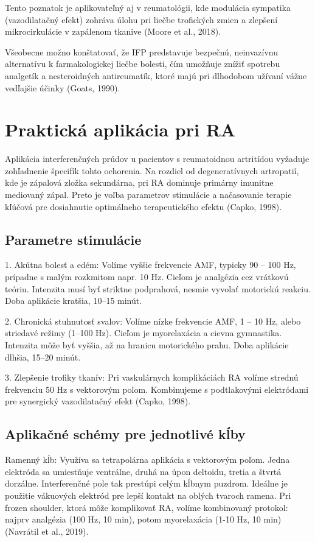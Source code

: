 Tento poznatok je aplikovateľný aj v reumatológii, kde modulácia sympatika (vazodilatačný efekt) zohráva úlohu pri liečbe trofických zmien a zlepšení mikrocirkulácie v zapálenom tkanive (Moore et al., 2018). 

Všeobecne možno konštatovať, že IFP predstavuje bezpečnú, neinvazívnu alternatívu k farmakologickej liečbe bolesti, čím umožňuje znížiť spotrebu analgetík a nesteroidných antireumatík, ktoré majú pri dlhodobom užívaní vážne vedľajšie účinky (Goats, 1990). 

\section{Praktická aplikácia pri RA}

Aplikácia interferenčných prúdov u pacientov s reumatoidnou artritídou vyžaduje zohľadnenie špecifík tohto ochorenia. Na rozdiel od degeneratívnych artropatií, kde je zápalová zložka sekundárna, pri RA dominuje primárny imunitne mediovaný zápal. Preto je voľba parametrov stimulácie a načasovanie terapie kľúčová pre dosiahnutie optimálneho terapeutického efektu (Capko, 1998). 

\subsection{Parametre stimulácie}

1. Akútna bolesť a edém: Volíme vyššie frekvencie AMF, typicky 90 – 100 Hz, prípadne s malým rozkmitom napr. 10 Hz. Cieľom je analgézia cez vrátkovú teóriu. Intenzita musí byť striktne podprahová, nesmie vyvolať motorickú reakciu. Doba aplikácie kratšia, 10–15 minút. 

2. Chronická stuhnutosť svalov: Volíme nízke frekvencie AMF, 1 – 10 Hz, alebo striedavé režimy (1–100 Hz). Cieľom je myorelaxácia a cievna gymnastika. Intenzita môže byť vyššia, až na hranicu motorického prahu. Doba aplikácie dlhšia, 15–20 minút. 

3. Zlepšenie trofiky tkanív: Pri vaskulárnych komplikáciách RA volíme strednú frekvenciu 50 Hz s vektorovým poľom. Kombinujeme s podtlakovými elektródami pre synergický vazodilatačný efekt (Capko, 1998). 

\subsection{Aplikačné schémy pre jednotlivé kĺby}

Ramenný kĺb: Využíva sa tetrapolárna aplikácia s vektorovým poľom. Jedna elektróda sa umiestňuje ventrálne, druhá na úpon deltoidu, tretia a štvrtá dorzálne. Interferenčné pole tak prestúpi celým kĺbnym puzdrom. Ideálne je použitie vákuových elektród pre lepší kontakt na oblých tvaroch ramena. Pri frozen shoulder, ktorá môže komplikovať RA, volíme kombinovaný protokol: najprv analgézia (100 Hz, 10 min), potom myorelaxácia (1-10 Hz, 10 min) (Navrátil et al., 2019). 

